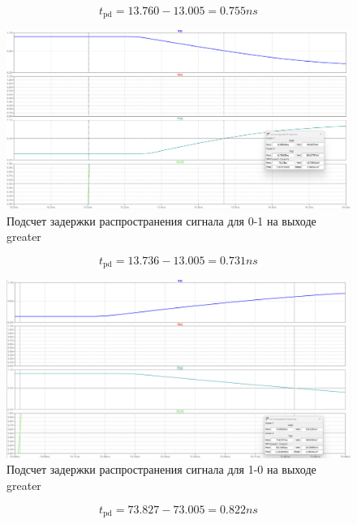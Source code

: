 \documentclass[12pt,onecolumn]{article}
\begin{document}
$$t_{\text{pd}} = 13.760 - 13.005 = 0.755 ns$$
\begin{figure}[H]
    \centering
    \includegraphics[width=\textwidth]{image/full-comparator-test-gt-01.png}
    \caption{Подсчет задержки распространения сигнала для 0-1 на выходе greater}
\end{figure}
$$t_{\text{pd}} = 13.736 - 13.005 = 0.731 ns$$
\begin{figure}[H]
    \centering
    \includegraphics[width=\textwidth]{image/full-comparator-test-gt-10.png}
    \caption{Подсчет задержки распространения сигнала для 1-0 на выходе greater}
\end{figure}
$$t_{\text{pd}} = 73.827 - 73.005 = 0.822 ns$$
\end{document}
